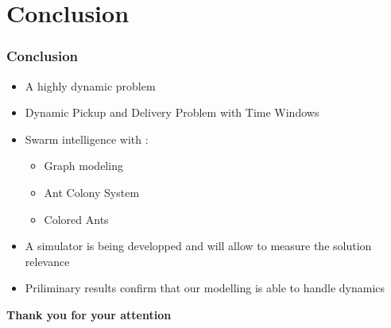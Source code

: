 \documentclass{beamer}
\begin{document}
\section{Conclusion}
\begin{frame}
 \frametitle{Conclusion}
	\begin{itemize}
	 \item A highly dynamic problem
	 \item Dynamic Pickup and Delivery Problem with Time Windows
	 \item Swarm intelligence with : 
	 \begin{itemize}
		\item Graph modeling
		\item Ant Colony System
		\item Colored Ants
	\end{itemize}
	 \item A simulator is being developped and will allow to measure the solution relevance
	 \item Priliminary results confirm that our modelling is able to handle dynamics
	\end{itemize}

	\pause
	\begin{center}
		\textbf{Thank you for your attention}
	\end{center}
\end{frame}
\tiny


% 
% 
\end{document}
